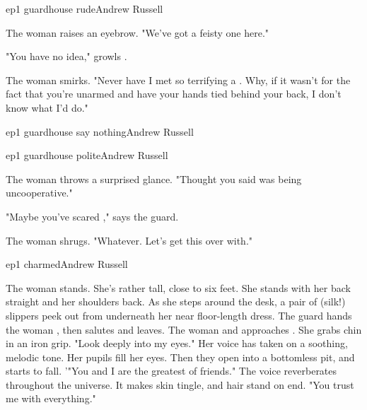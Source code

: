 \documentclass{book}
\begin{document}
\begin{childnode}{ep1 guardhouse rude}{Andrew Russell}

The woman raises an eyebrow. "We've got a feisty one here."

"You have no idea," growls \name{}.

The woman smirks. "Never have I met so terrifying a \manwoman{}. Why, if it wasn't for the fact 
that you're unarmed and have your hands tied behind your back, I don't know what I'd do."


\end{childnode}

\begin{childnode}{ep1 guardhouse say nothing}{Andrew Russell}



\end{childnode}

\begin{childnode}{ep1 guardhouse polite}{Andrew Russell}


The woman throws \name{} a surprised glance. "Thought you said \heshe{} was being uncooperative."

"Maybe you've scared \himher{}," says the guard.

The woman shrugs. "Whatever. Let's get this over with."


\end{childnode}

\begin{childnode}{ep1 charmed}{Andrew Russell}

The woman stands. She's rather tall, close to six feet. She stands with her back straight and her 
shoulders back. As she steps around the desk, a pair of (silk!) slippers peek out from underneath 
her near floor-length dress.
The guard hands the woman \names{} \weapon{}, then salutes and leaves.
The woman  and approaches \name{}. She grabs 
\names{} chin in an iron grip. "Look deeply into my eyes."
    Her voice has taken on a soothing, melodic tone. Her pupils fill her eyes. Then they open into 
a bottomless pit, and \name{} starts to fall.
    '"You and I are the greatest of friends." The voice reverberates throughout the universe. It 
makes \names{} skin tingle, and \hisher{} hair stand on end. "You trust me with everything."



\end{childnode}
\end{document}
